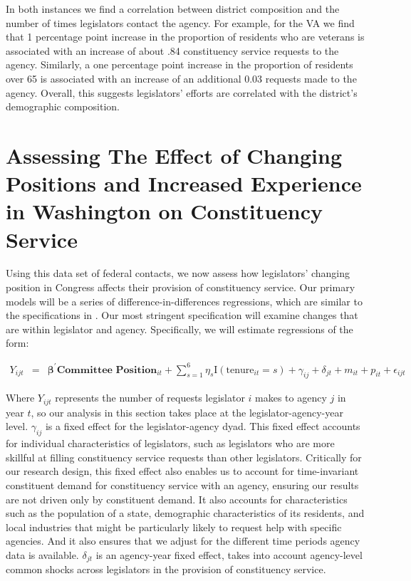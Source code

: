 \documentclass[12pt]{article}
\begin{document}
In both instances we find a correlation between district composition and the number of times legislators contact the agency.  For example, for the VA we find that 1 percentage point increase in the proportion of residents who are veterans is associated with an increase of about .84 constituency service requests to the agency. Similarly, a one percentage point increase in the proportion of residents over 65 is associated with an increase of an additional 0.03 requests made to the agency. Overall, this suggests legislators' efforts are correlated with the district's demographic composition.  


\section{Assessing The Effect of Changing Positions and Increased Experience in Washington on Constituency Service}\label{s:prestige} 

Using this data set of federal contacts, we now assess how legislators' changing position in Congress affects their provision of constituency service.  Our primary models will be a series of difference-in-differences regressions, which are similar to the specifications in \cite{BerryFowler2016}.  Our most stringent specification will examine changes that are within legislator and agency.  Specifically, we will estimate regressions of the form: 

\begin{eqnarray}
Y_{ijt} & = & \boldsymbol{\beta}^{'} \textbf{Committee Position}_{it}   + \sum_{s = 1}^{6} \eta_{s} \text{I}\left(\text{tenure}_{it} = s\right) + \gamma_{ij} +  \delta_{jt} +  m_{it} + p_{it} +  \epsilon_{ijt} \label{e:diff1}
\end{eqnarray}

Where $Y_{ijt}$ represents the number of requests legislator $i$ makes to agency $j$ in year $t$, so our analysis in this section takes place at the legislator-agency-year level.  $\gamma_{ij}$ is a fixed effect for the legislator-agency dyad.  This fixed effect accounts for individual characteristics of legislators, such as legislators who are more skillful at filling constituency service requests than other legislators.  Critically for our research design, this fixed effect also enables us to account for time-invariant constituent demand for constituency service with an agency, ensuring our results are not driven only by constituent demand.  It also accounts for characteristics such as the population of a state, demographic characteristics of its residents, and local industries that might be particularly likely to request help with specific agencies.  And it also ensures that we adjust for the different time periods agency data is available.  $\delta_{jt}$ is an agency-year fixed effect, takes into account agency-level common shocks across legislators in the provision of constituency service.    
\end{document}
